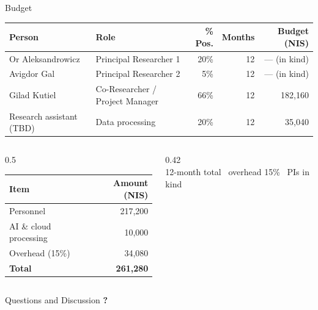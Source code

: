 \documentclass[aspectratio=169]{beamer}
\begin{document}
\begin{frame}{Budget}
  \centering
  \vspace{0.2em}
  {\footnotesize
  \begin{tabular}{@{}llrrr@{}}
    \toprule
    \textbf{Person} & \textbf{Role} & \textbf{\% Pos.} & \textbf{Months} & \textbf{Budget (NIS)} \\
    \midrule
    Or Aleksandrowicz        & Principal Researcher 1          & 20\% & 12 & --- (in kind) \\
    Avigdor Gal              & Principal Researcher 2          & 5\%  & 12 & --- (in kind) \\
    Gilad Kutiel             & Co-Researcher / Project Manager & 66\% & 12 & 182{,}160 \\
    Research assistant (TBD) & Data processing                 & 20\% & 12 & 35{,}040 \\
    \bottomrule
  \end{tabular}}

  \vspace{1.4em}
  \begin{columns}[c,onlytextwidth]
    \begin{column}{0.5\textwidth}
      \centering
      {\footnotesize
      \begin{tabular}{@{}lr@{}}
        \toprule
        \textbf{Item} & \textbf{Amount (NIS)} \\
        \midrule
        Personnel               & 217{,}200 \\
        AI \& cloud processing  & 10{,}000 \\
        Overhead (15\%)         & 34{,}080 \\
        \midrule
        \textbf{Total}          & \textbf{261{,}280} \\
        \bottomrule
      \end{tabular}}
    \end{column}
    \begin{column}{0.42\textwidth}
      \centering
      \\[0.3em]
      {\scriptsize 12-month total \textbullet\ overhead 15\% \textbullet\ PIs in kind}
    \end{column}
  \end{columns}
\end{frame}

\begin{frame}{Questions and Discussion}
  \centering
  \vfill
  {\fontsize{200}{200}\selectfont\textbf{?}}
  \vfill
\end{frame}
\end{document}

